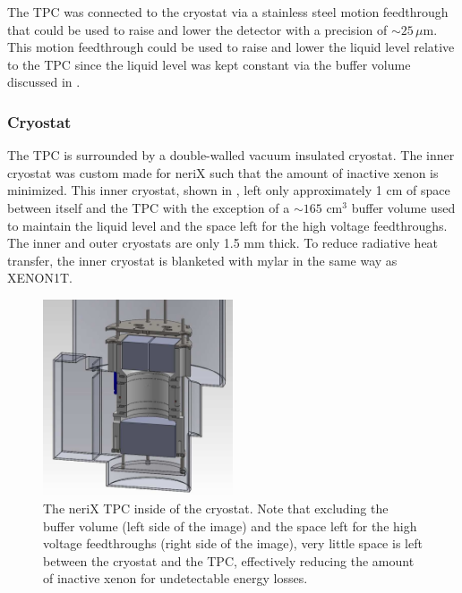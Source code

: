 The TPC was connected to the cryostat via a stainless steel motion feedthrough that could be used to raise and lower the detector with a precision of $\sim 25 \, \mu$m.  This motion feedthrough could be used to raise and lower the liquid level relative to the TPC since the liquid level was kept constant via the buffer volume discussed in .



\subsubsection{Cryostat}
\label{sec:nerix_cryostat}

The TPC is surrounded by a double-walled vacuum insulated cryostat.  The inner cryostat was custom made for neriX such that the amount of inactive xenon is minimized.  This inner cryostat, shown in , left only approximately 1 cm of space between itself and the TPC with the exception of a $\sim 165 \, \, \textrm{cm}^3$ buffer volume used to maintain the liquid level and the space left for the high voltage feedthroughs.   The inner and outer cryostats are only 1.5 mm thick.  To reduce radiative heat transfer, the inner cryostat is blanketed with mylar in the same way as XENON1T.


\begin{figure}[t]
        \centering
	\includegraphics[width=0.5\textwidth]{nerix_cryostat_tpc}
	\caption{The neriX TPC inside of the cryostat.  Note that excluding the buffer volume (left side of the image) and the space left for the high voltage feedthroughs (right side of the image), very little space is left between the cryostat and the TPC, effectively reducing the amount of inactive xenon for undetectable energy losses.}
	\label{fig:nerix_cryostat_tpc}
\end{figure}


